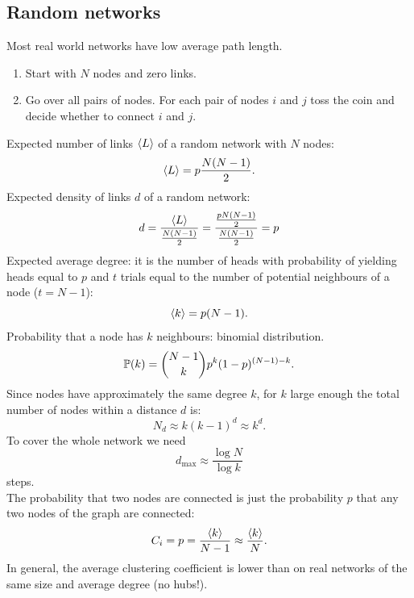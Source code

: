 \documentclass[a4paper,9pt]{extarticle}
\begin{document}
\begin{multicols*}{2}
\subsection{Random networks}
Most real world networks have low average path length.
\begin{riquadro}
	\begin{enumerate}
		\item Start with $N$ nodes and zero links.
		\item Go over all pairs of nodes. For each pair of nodes $i$ and $j$ toss the coin and decide whether to connect $i$ and $j$.
	\end{enumerate}
\end{riquadro}
Expected number of links $\langle L \rangle$ of a random network with $N$ nodes:
\begin{equation*}
	\langle L \rangle=p\frac{N(N-1)}{2}.
\end{equation*}
Expected density of links $d$ of a random network:
\begin{equation*}
	d=\frac{\langle L \rangle}{\frac{N(N-1)}{2}}=\frac{\frac{pN(N-1)}{2}}{\frac{N(N-1)}{2}}=p
\end{equation*}
Expected average degree: it is the number of heads with probability of yielding heads equal to $p$ and $t$ trials equal to the number of potential neighbours of a node ($t=N-1$):
\begin{equation*}
	\langle k \rangle=p(N-1).
\end{equation*}
Probability that a node has $k$ neighbours: binomial distribution.
\begin{equation*}
	\mathbb{P}(k)={N-1\choose k}p^{k}(1-p)^{(N-1)-k}.
\end{equation*}
Since nodes have approximately the same degree $k$, for $k$ large enough the total number of nodes within a distance $d$ is:
\begin{equation*}
	N_{d}\approx k(k-1)^{d}\approx k^{d}.
\end{equation*}
To cover the whole network we need 
\begin{equation*}
	d_{\max}\approx\frac{\log N}{\log k}
\end{equation*}
steps. \\
The probability that two nodes are connected is just the probability $p$ that any two nodes of the graph are connected:
\begin{equation*}
	C_{i}=p=\frac{\langle k \rangle}{N-1}\approx\frac{\langle k \rangle}{N}.
\end{equation*}
In general, the average clustering coefficient is lower than on real networks of the same size and average degree (no hubs!).

\end{multicols*}
\end{document}
